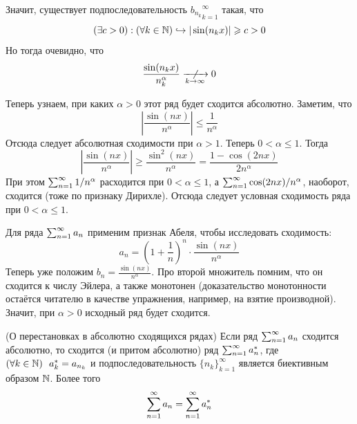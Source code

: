 \begin{example}
\begin{itemize}
		Значит, существует подпоследовательность ${b_{n_k}}_{k = 1}^\infty$ такая, что
		\[
			(\exists c > 0) : (\forall k \in \mathbb{N}) \hookrightarrow |\sin (n_k x)| \geqslant c > 0
		\]
		Но тогда очевидно, что
		\[
			\frac{\sin (n_k x)}{n_k^\alpha} \centernot{\xrightarrow[k \to \infty]{}} 0
		\]
	\end{itemize}

	Теперь узнаем, при каких $\alpha > 0$ этот ряд будет сходится абсолютно. Заметим, что
	\[
		\left|\frac{\sin (nx)}{n^\alpha}\right| \le \frac{1}{n^\alpha}
	\]
	Отсюда следует абсолютная сходимости при $\alpha > 1$. Теперь $0 < \alpha \le 1$. Тогда
	\[
		\left|\frac{\sin (nx)}{n^\alpha}\right| \ge \frac{\sin^2 (nx)}{n^\alpha} = \frac{1 - \cos (2nx)}{2n^\alpha}
	\]
	При этом $\sum_{n = 1}^\infty 1 / n^\alpha$ расходится при $0 < \alpha \le 1$, а $\sum_{n = 1}^\infty \cos(2nx) / n^\alpha$, наоборот, сходится (тоже по признаку Дирихле). Отсюда следует условная сходимость ряда при $0 < \alpha \le 1$.
\end{example}

\begin{example}
	Для ряда $\sum_{n = 1}^\infty a_n$ применим признак Абеля, чтобы исследовать сходимость:
	\[
		a_n = \left(1 + \frac{1}{n}\right)^n \cdot \frac{\sin(nx)}{n^\alpha}
	\]
	Теперь уже положим $b_n = \frac{\sin(nx)}{n^\alpha}$. Про второй множитель помним, что он сходится к числу Эйлера, а также монотонен (доказательство монотонности остаётся читателю в качестве упражнения, например, на взятие производной). Значит, при $\alpha > 0$ исходный ряд будет сходится.
\end{example}

\begin{theorem} (О перестановках в абсолютно сходящихся рядах)
	Если ряд $\sum_{n = 1}^\infty a_n$ сходится абсолютно, то сходится (и притом абсолютно) ряд $\sum_{n = 1}^\infty a^*_n$, где $(\forall k \in \N)\ \ a^*_k = a_{n_k}$ и подпоследовательность $\{n_k\}_{k = 1}^\infty$ является биективным образом $\mathbb{N}$. Более того
	\[
		\sum_{n = 1}^\infty a_n = \sum_{n = 1}^\infty a^*_n
	\]
\end{theorem}

